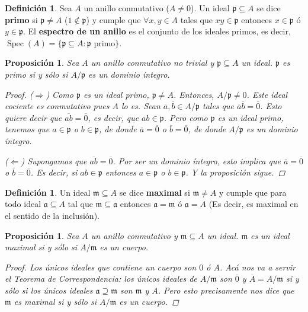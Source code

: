 \documentclass[12pt]{book}
\newtheorem{prop}[teo]{Proposición}
\theoremstyle{definition}
\newtheorem{defn}[teo]{Definición}
\DeclareMathOperator{\spec}{Spec}
\begin{document}
\begin{defn}
Sea $A$ un anillo conmutativo ($A\neq 0$). Un ideal $\mathfrak{p}\subseteq A$ se dice \textbf{primo} si $\mathfrak{p}\neq A$ ($1\notin \mathfrak{p}$) y cumple que $\forall x,y\in A$ tales que $xy\in \mathfrak{p}$ entonces $x\in\mathfrak{p}$ ó $y\in\mathfrak{p}$. El \textbf{espectro de un anillo} es el conjunto de los ideales primos, es decir, $\spec(A) = \{\mathfrak{p}\subseteq A : \mathfrak{p}\text{ primo}\}$.
\end{defn}

\begin{prop}
Sea $A$ un anillo conmutativo no trivial y $\mathfrak{p}\subseteq A$ un ideal. $\mathfrak{p}$ es primo si y sólo si $A/\mathfrak{p}$ es un dominio íntegro.
\begin{proof}
($\Longrightarrow$) Como $\mathfrak{p}$ es un ideal primo, $\mathfrak{p}\neq A$. Entonces, $A/\mathfrak{p}\neq 0$. Este ideal cociente es conmutativo pues $A$ lo es. Sean $\overline{a},\overline{b}\in A/\mathfrak{p}$ tales que $\overline{a}\overline{b}=\overline{0}$. Esto quiere decir que $\overline{ab}=\overline{0}$, es decir, que $ab\in\mathfrak{p}$. Pero como $\mathfrak{p}$ es un ideal primo, tenemos que $a\in\mathfrak{p}$ o $b\in\mathfrak{p}$, de donde $\overline{a}=\overline{0}$ o $\overline{b}=\overline{0}$, de donde $A/\mathfrak{p}$ es un dominio íntegro.

($\Longleftarrow$) Supongamos que $\overline{ab}=\overline{0}$. Por ser un dominio íntegro, esto implica que $\overline{a}=\overline{0}$ o $\overline{b}=\overline{0}$. Es decir, si $ab\in\mathfrak{p}$ entonces $a\in\mathfrak{p}$ o $b\in\mathfrak{p}$. Y la proposición sigue.
\end{proof}
\end{prop}

\begin{defn}
Un ideal $\mathfrak{m}\subseteq A$ se dice \textbf{maximal} si $\mathfrak{m}\neq A$ y cumple que para todo ideal $\mathfrak{a}\subseteq A$ tal que $\mathfrak{m}\subseteq \mathfrak{a}$ entonces $\mathfrak{a}=\mathfrak{m}$ ó $\mathfrak{a}=A$ (Es decir, es maximal en el sentido de la inclusión).
\end{defn}

\begin{prop}
Sea $A$ un anillo conmutativo y $\mathfrak{m}\subseteq A$ un ideal. $\mathfrak{m}$ es un ideal maximal si y sólo si $A/\mathfrak{m}$ es un cuerpo.
\begin{proof}
Los únicos ideales que contiene un cuerpo son $0$ ó $A$. Acá nos va a servir el Teorema de Correspondencia: los únicos ideales de $A/\mathfrak{m}$ son $\overline{0}$ y $\overline{A}=A/\mathfrak{m}$ si y sólo si los únicos ideales $\mathfrak{a}\supseteq \mathfrak{m}$ son $\mathfrak{m}$ y $A$. Pero esto precisamente nos dice que $\mathfrak{m}$ es maximal si y sólo si $A/\mathfrak{m}$ es un cuerpo.
\end{proof}
\end{prop}
\end{document}
